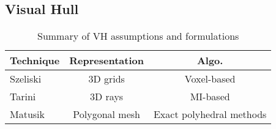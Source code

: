 \subsection{Visual Hull}
\begin{table}[h]
  \centering
  \begin{tabular}{l*{2}{c}}
  \hline
  \textbf{Technique} & Representation & Algo.\\
  \hline
  Szeliski~\cite{szeliski1993rapid} & 3D grids & Voxel-based\\
  Tarini~\cite{tarini2002marching} & 3D rays & MI-based\\
  Matusik~\cite{matusik2002efficient} & Polygonal mesh & Exact polyhedral methods\\
  \hline
  \end{tabular}
  \caption{Summary of VH assumptions and formulations}
  \label{tab:class_4}
\end{table}

